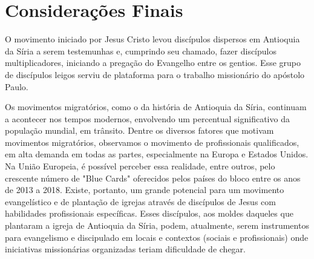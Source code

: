 \documentclass[12pt,openright,oneside,a4paper]{abntex2}
\begin{document}
\chapter*{Considerações Finais}
O movimento iniciado por Jesus Cristo levou discípulos dispersos em Antioquia da Síria a serem testemunhas e, cumprindo seu chamado, fazer discípulos multiplicadores, iniciando a pregação do Evangelho entre os gentios. Esse grupo de discípulos leigos serviu de plataforma para o trabalho missionário do apóstolo Paulo. 

Os movimentos migratórios, como o da história de Antioquia da Síria, continuam a acontecer nos tempos modernos, envolvendo um percentual significativo da população mundial, em trânsito. Dentre os diversos fatores que motivam movimentos migratórios, observamos o movimento de profissionais qualificados, em alta demanda em todas as partes, especialmente na Europa e Estados Unidos. Na União Europeia, é possível perceber essa realidade, entre outros, pelo crescente número de "Blue Cards" oferecidos pelos países do bloco entre os anos de 2013 a 2018. Existe, portanto, um grande potencial para um movimento evangelístico e de plantação de igrejas através de discípulos de Jesus com habilidades profissionais específicas. Esses discípulos, aos moldes daqueles que plantaram a igreja de Antioquia da Síria, podem, atualmente, serem instrumentos para evangelismo e discipulado em locais e contextos (sociais e profissionais) onde iniciativas missionárias organizadas teriam dificuldade de chegar.
\end{document}
